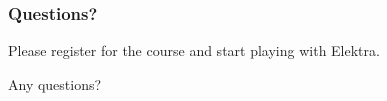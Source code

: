 \begin{assignment}
	\frametitle{Questions?}
	\begin{task}
	Please register for the course and start playing with Elektra.
	\end{task}

	\begin{task}
	Any questions?
	\end{task}
\end{assignment}



\nocite{raab2017introducing}

\appendix

\begin{frame}[allowframebreaks]
	
	
\end{frame}




